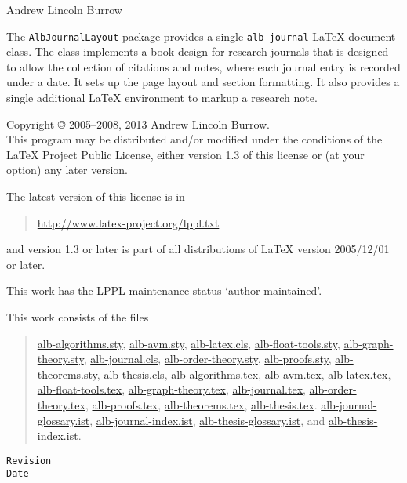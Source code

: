 \documentclass[11pt,a4paper,oneside,titlepage]{alb-latex}
\begin{document}



\begin{albTitlePage}


  Andrew Lincoln Burrow


  The \texttt{AlbJournalLayout} package provides a single
  \texttt{alb-journal} \LaTeX{} document class.  The class implements a
  book design for research journals that is designed to allow the
  collection of citations and notes, where each journal entry is
  recorded under a date.  It sets up the page layout and section
  formatting.  It also provides a single additional \LaTeX{} environment
  to markup a research note.



  Copyright \copyright{} 2005--2008, 2013 Andrew Lincoln Burrow.\\
  This program may be distributed and/or modified under the conditions
  of the \LaTeX{} Project Public License, either version 1.3 of this
  license or (at your option) any later version.

  \medskip{}

  The latest version of this license is in
  \begin{quote}
    \url{http://www.latex-project.org/lppl.txt}
  \end{quote}
  and version 1.3 or later is part of all distributions of LaTeX version
  2005/12/01 or later.

  \medskip{}

  This work has the LPPL maintenance status `author-maintained'.

  \medskip{}

  This work consists of the files
  \begin{quote}
    \begin{flushleft}
      \url{alb-algorithms.sty}, \url{alb-avm.sty}, \url{alb-latex.cls},
      \url{alb-float-tools.sty}, \url{alb-graph-theory.sty},
      \url{alb-journal.cls}, \url{alb-order-theory.sty},
      \url{alb-proofs.sty}, \url{alb-theorems.sty},
      \url{alb-thesis.cls}, \url{alb-algorithms.tex}, \url{alb-avm.tex},
      \url{alb-latex.tex}, \url{alb-float-tools.tex},
      \url{alb-graph-theory.tex}, \url{alb-journal.tex},
      \url{alb-order-theory.tex}, \url{alb-proofs.tex},
      \url{alb-theorems.tex}, \url{alb-thesis.tex}.
      \url{alb-journal-glossary.ist}, \url{alb-journal-index.ist},
      \url{alb-thesis-glossary.ist}, and \url{alb-thesis-index.ist}.
    \end{flushleft}
  \end{quote}



  \verb$Revision$\\
  \verb$Date$

\end{albTitlePage}
\end{document}
